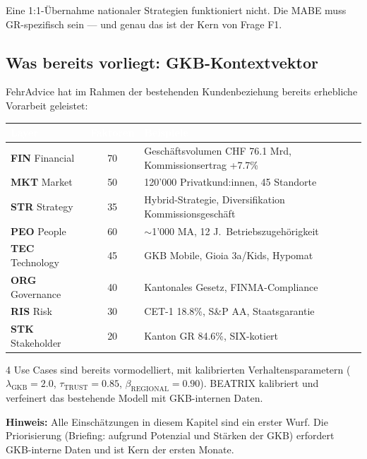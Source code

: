 \documentclass[11pt,a4paper]{article}
\newcommand{\headerrow}{\rowcolor{fadarkblue}}
\newcommand{\altrow}{\rowcolor{falightgray}}
\begin{document}
\vspace{0.2cm}

Eine 1:1-Übernahme nationaler Strategien funktioniert nicht. Die MABE muss GR-spezifisch sein --- und genau das ist der Kern von Frage F1.

\subsection{Was bereits vorliegt: GKB-Kontextvektor}

FehrAdvice hat im Rahmen der bestehenden Kundenbeziehung bereits erhebliche Vorarbeit geleistet:

\begin{center}
\begin{tabularx}{\textwidth}{l c X}
\toprule
\headerrow \textcolor{white}{\textbf{Layer}} & \textcolor{white}{\textbf{Faktoren}} & \textcolor{white}{\textbf{Beispiele}} \\
\midrule
\textbf{FIN} Financial & 70 & Geschäftsvolumen CHF 76.1 Mrd, Kommissionsertrag +7.7\% \\
\altrow \textbf{MKT} Market & 50 & 120'000 Privatkund:innen, 45 Standorte \\
\textbf{STR} Strategy & 35 & Hybrid-Strategie, Diversifikation Kommissionsgeschäft \\
\altrow \textbf{PEO} People & 60 & $\sim$1'000 MA, 12 J.\ Betriebszugehörigkeit \\
\textbf{TEC} Technology & 45 & GKB Mobile, Gioia 3a/Kids, Hypomat \\
\altrow \textbf{ORG} Governance & 40 & Kantonales Gesetz, FINMA-Compliance \\
\textbf{RIS} Risk & 30 & CET-1 18.8\%, S\&P AA, Staatsgarantie \\
\altrow \textbf{STK} Stakeholder & 20 & Kanton GR 84.6\%, SIX-kotiert \\
\bottomrule
\end{tabularx}
\end{center}

\vspace{0.2cm}

4 Use Cases sind bereits vormodelliert, mit kalibrierten Verhaltensparametern ($\lambda_\text{GKB} = 2.0$, $\tau_\text{TRUST} = 0.85$, $\beta_\text{REGIONAL} = 0.90$). BEATRIX kalibriert und verfeinert das bestehende Modell mit GKB-internen Daten.

\vspace{0.3cm}

\begin{fahighlight}
\textbf{Hinweis:} Alle Einschätzungen in diesem Kapitel sind ein erster Wurf. Die Priorisierung (Briefing: \guillemotleft aufgrund Potenzial und Stärken der GKB\guillemotright) erfordert GKB-interne Daten und ist Kern der ersten Monate.
\end{fahighlight}
\end{document}
